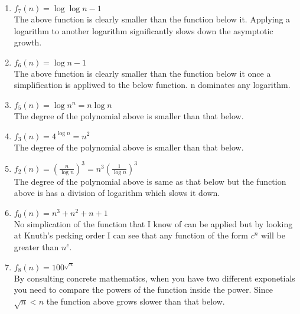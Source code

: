 \documentclass[12pt]{article}
\begin{document}
\begin{enumerate}
\item \begin{math}f_7(n) = \log{\log{n-1}}\end{math}\\
The above function is clearly smaller than the function below it. Applying a logarithm to another logarithm significantly slows down the asymptotic growth.
\item \begin{math}f_6(n) = \log{n-1}\end{math}\\
The above function is clearly smaller than the function below it once a simplification is appliwed to the below function. n dominates any logarithm.
\item \begin{math}f_5(n) = \log{n^n} = n \log{n}\end{math}\\
The degree of the polynomial above is smaller than that below.
\item \begin{math}f_3(n) = 4^{\log{n}} = n^2 \end{math}\\
The degree of the polynomial above is smaller than that below.
\item \begin{math}f_2(n) = (\frac{n}{\log{n}})^3=n^3(\frac{1}{\log{n}})^3\end{math}\\
The degree of the polynomial above is same as that below but the function above is has a division of logarithm which slows it down.
\item \begin{math}f_0(n) = n^3 + n^2 + n + 1\end{math}\\
No simplication of the function that I know of can be applied but by looking at Knuth's pecking order I can see that any function of the form \begin{math}c^n\end{math} will be greater than \begin{math}n^c\end{math}.
\item \begin{math}f_8(n) = 100^{\sqrt{n}}\end{math}\\
By consulting concrete mathematics, when you have two different exponetials you need to compare the powers of the function inside the power. Since \begin{math}\sqrt{n} < n\end{math} the function above grows slower than that below.

\end{enumerate}
\end{document}
